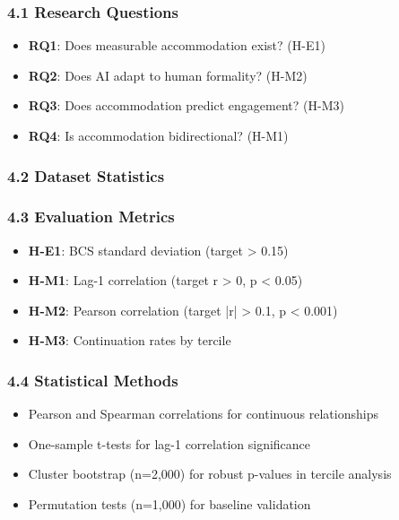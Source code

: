 
\subsubsection{4.1 Research Questions}

\begin{itemize}
\item \textbf{RQ1}: Does measurable accommodation exist? (H-E1)
\item \textbf{RQ2}: Does AI adapt to human formality? (H-M2)
\item \textbf{RQ3}: Does accommodation predict engagement? (H-M3)
\item \textbf{RQ4}: Is accommodation bidirectional? (H-M1)
\end{itemize}

\subsubsection{4.2 Dataset Statistics}

\begin{table}[htbp]
\centering
{}
\end{table}

\subsubsection{4.3 Evaluation Metrics}

\begin{itemize}
\item \textbf{H-E1}: BCS standard deviation (target > 0.15)
\item \textbf{H-M1}: Lag-1 correlation (target r > 0, p < 0.05)
\item \textbf{H-M2}: Pearson correlation (target |r| > 0.1, p < 0.001)
\item \textbf{H-M3}: Continuation rates by tercile
\end{itemize}

\subsubsection{4.4 Statistical Methods}

\begin{itemize}
\item Pearson and Spearman correlations for continuous relationships
\item One-sample t-tests for lag-1 correlation significance
\item Cluster bootstrap (n=2,000) for robust p-values in tercile analysis
\item Permutation tests (n=1,000) for baseline validation
\end{itemize}

